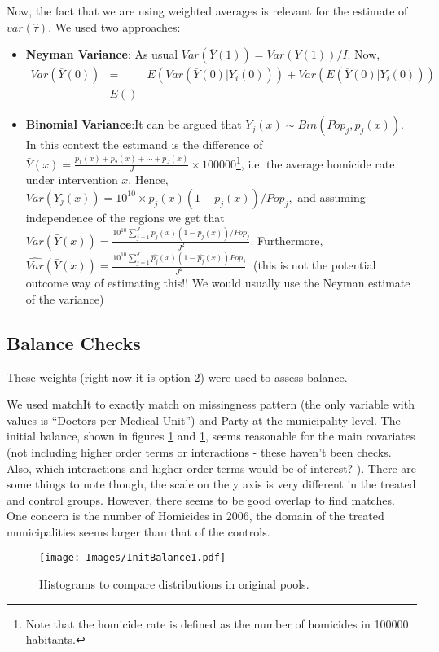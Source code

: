 \documentclass{article}[11 pt]
\begin{document}
Now, the fact that we are using weighted averages is relevant for the estimate of $var(\hat{\tau}).$ We used two approaches:
\begin{itemize}
	\item \textbf{Neyman Variance}: As usual $Var(\overline{Y}(1))=Var(Y(1))/I$. Now, 
	\begin{eqnarray*}
		Var(\overline{Y}(0))&=&E(Var(\overline{Y}(0)|Y_i(0))) + Var(E(\overline{Y}(0)|Y_i(0)))\\
		&E() &
	\end{eqnarray*}
	
	\item \textbf{Binomial Variance}:It can be argued that $Y_j(x)\sim Bin(Pop_j,p_j(x))$. In this context the estimand is the difference of $\bar{Y}(x)=\frac{p_1(x)+p_2(x)+\cdots+p_J(x)}{J}\times 100000$\footnote{Note that the homicide rate is defined as the number of homicides in 100000 habitants.}, i.e. the average homicide rate under intervention $x$. Hence, 
$Var(Y_j(x))=10^{10}\times p_j(x)(1-p_j(x))/Pop_j ,$ and assuming independence of the regions we get that
$Var(\bar{Y}(x))=\frac{10^{10}\sum_{j=1}^Jp_j(x)(1-p_j(x))/Pop_j}{J^2}.$
Furthermore, $\hat{Var}(\bar{Y}(x))=\frac{10^{10}\sum_{j=1}^J\hat{p_j}(x)(1-\hat{p_j}(x))Pop_j}{J^2}.$ (this is not the potential outcome way of estimating this!! We would usually use the Neyman estimate of the variance)
\end{itemize}
\subsection{Balance Checks}
These weights (right now it is option 2) were used to assess balance.

We used matchIt to exactly match on missingness pattern (the only variable with values is ``Doctors per Medical Unit'') and Party at the municipality level. The initial balance, shown in figures \ref{initBalance1} and \ref{initBalance1}, seems reasonable for the main covariates (not including higher order terms or interactions - these haven't been checks. Also, which interactions and higher order terms would be of interest? ). There are some things to note though, the scale on the y axis is very different in the treated and control groups. However, there seems to be good overlap to find matches. One concern is the number of Homicides in 2006, the domain of the treated municipalities seems larger than that of the controls.

\begin{figure}[ht]

    \centering
        \texttt{[image: Images/InitBalance1.pdf]}
\caption{Histograms to compare distributions in original pools.}
\label{initBalance1}
\end{figure}
\end{document}
